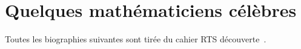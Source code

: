 \chapter{Quelques mathématiciens célèbres}

Toutes les biographies suivantes sont tirée du cahier RTS découverte~\cite{RTS}.






